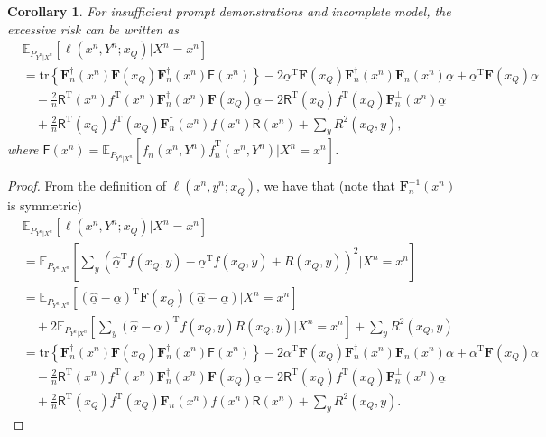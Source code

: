 \documentclass{article} %
\theoremstyle{plain} %
\newtheorem{corollary}[theorem]{Corollary}
\begin{document}
\begin{corollary}\label{col:excessive_risk_incomplete_insufficient}
For insufficient prompt demonstrations and incomplete model, the excessive risk can be written as
\begin{align*}
& \mathbb{E}_{P_{Y^n|X^n}}\left[ 
\ell \left(x^n,Y^n;x_Q\right) | X^n = x^n\right]\\
& = \mathrm{tr}\left\{ \mathbf{F}_n^{\dagger}(x^n)\mathbf{F}(x_Q)\mathbf{F}_n^{\dagger}(x^n) \mathsf{F}(x^n) \right\}  - 2\underline{\alpha}^\mathrm{T}\mathbf{F}(x_Q)\mathbf{F}_n^{\dagger}(x^n)\mathbf{F}_n(x^n)\underline{\alpha} + \underline{\alpha}^{\mathrm{T}} \mathbf{F}(x_Q)\underline{\alpha}\\
& \quad -\frac2n \mathsf{R}^\mathrm{T}(x^n)f^\mathrm{T}(x^n)\mathbf{F}_n^{\dagger}(x^n)\mathbf{F}(x_Q)\underline{\alpha} - 2 \mathsf{R}^\mathrm{T}(x_Q)f^\mathrm{T}(x_Q)\mathbf{F}_n^\perp(x^n)\underline{\alpha}\\  
& \quad + \frac2n \mathsf{R}^\mathrm{T}(x_Q)f^\mathrm{T}(x_Q)\mathbf{F}_n^{\dagger}(x^n)f(x^n)\mathsf{R}(x^n) + \sum_y R^2(x_Q,y), 
\end{align*}
where $\mathsf{F}(x^n) = \mathbb{E}_{P_{Y^n|X^n}}\left[\bar{f}_n(x^n,Y^n) \bar{f}_n^\mathrm{T}(x^n,Y^n) | X^n=x^n\right]$.
\end{corollary}
\begin{proof}
    From the definition of $\ell \left(x^n,y^n;x_Q\right)$, we have that (note that $\mathbf{F}_n^{-1}(x^n)$ is symmetric)
\begin{align*}
&\mathbb{E}_{P_{Y^n|X^n}}\left[ 
\ell \left(x^n,Y^n;x_Q\right) | X^n = x^n\right]\\
& = \mathbb{E}_{P_{Y^n|X^n}}\left[ \sum_y \left( \underline{\hat{\alpha}}^\mathrm{T} f(x_Q,y) - \underline{\alpha}^\mathrm{T}f(x_Q,y) + R(x_Q,y)\right)^2 | X^n=x^n\right]\\
& = \mathbb{E}_{P_{Y^n|X^n}}\left[ \left(\underline{\hat{\alpha}} - \underline{\alpha}\right)^\mathrm{T} \mathbf{F}(x_Q) \left(\underline{\hat{\alpha}} - \underline{\alpha}\right) | X^n=x^n \right]\\
& \quad + 2\mathbb{E}_{P_{Y^n|X^n}}\left[ \sum_y  \left(\underline{\hat{\alpha}}-\underline{\alpha} \right)^\mathrm{T} f(x_Q,y) R(x_Q,y) | X^n=x^n\right] + \sum_y R^2(x_Q,y)\\
& = \mathrm{tr}\left\{ \mathbf{F}_n^{\dagger}(x^n)\mathbf{F}(x_Q)\mathbf{F}_n^{\dagger}(x^n) \mathsf{F}(x^n) \right\}  - 2\underline{\alpha}^\mathrm{T}\mathbf{F}(x_Q)\mathbf{F}_n^{\dagger}(x^n)\mathbf{F}_n(x^n)\underline{\alpha} + \underline{\alpha}^{\mathrm{T}} \mathbf{F}(x_Q)\underline{\alpha}\\
& \quad -\frac2n \mathsf{R}^\mathrm{T}(x^n)f^\mathrm{T}(x^n)\mathbf{F}_n^{\dagger}(x^n)\mathbf{F}(x_Q)\underline{\alpha} - 2 \mathsf{R}^\mathrm{T}(x_Q)f^\mathrm{T}(x_Q)\mathbf{F}_n^\perp(x^n)\underline{\alpha}\\  
& \quad + \frac2n \mathsf{R}^\mathrm{T}(x_Q)f^\mathrm{T}(x_Q)\mathbf{F}_n^{\dagger}(x^n)f(x^n)\mathsf{R}(x^n) + \sum_y R^2(x_Q,y).
\end{align*}
\end{proof}
\end{document}
